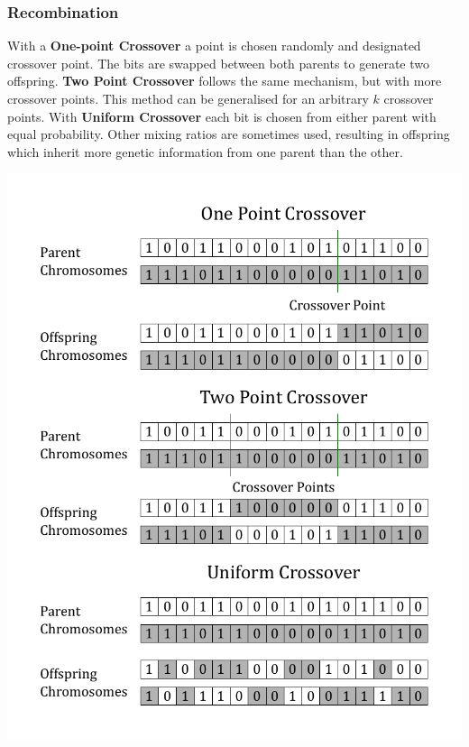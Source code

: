 \documentclass[11pt]{article}
\begin{document}
\subsubsection{Recombination}
\begin{minipage}{0.5\linewidth}
	With a \textbf{One-point Crossover} a point is chosen randomly and designated crossover point. The bits are swapped between both parents to generate two offspring. \textbf{Two Point Crossover} follows the same mechanism, but with more crossover points. This method can be generalised for an arbitrary $k$ crossover points. With \textbf{Uniform Crossover} each bit is chosen from either parent with equal probability. Other mixing ratios are sometimes used, resulting in offspring which inherit more genetic information from one parent than the other.
	
	\vspace{3cm}
\end{minipage}
\begin{minipage}{0.5\linewidth}
	\begin{center}
		\includegraphics[width=\linewidth,keepaspectratio]{genetic_algorithm_crossovers}
	\end{center}
\end{minipage}
\end{document}
